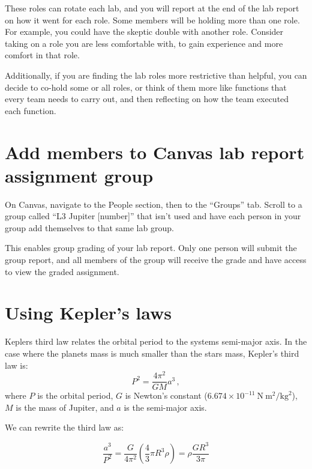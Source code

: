 These roles can rotate each lab, and you will report at the end of the lab report on how it went for each role. Some members will be holding more than one role. For example, you could have the skeptic double with another role. Consider taking on a role you are less comfortable with, to gain experience and more comfort in that role.

Additionally, if you are finding the lab roles more restrictive than helpful, you can decide to co-hold some or all roles, or think of them more like functions that every team needs to carry out, and then reflecting on how the team executed each function.

\section{Add members to Canvas lab report assignment group}

\begin{steps}
	\item On Canvas, navigate to the People section, then to the ``Groups'' tab. Scroll to a group called ``L3 Jupiter [number]'' that isn't used and have each person in your group add themselves to that same lab group.
\end{steps}

This enables group grading of your lab report. Only one person will submit the group report, and all members of the group will receive the grade and have access to view the graded assignment.

\section{Using Kepler's laws}

Keplers third law relates the orbital period to the systems semi-major axis. In the case where the planets mass is much smaller than the stars mass, Kepler's third law is:
\begin{equation}
P^2 = \frac{4\pi^2}{G M}a^3 \,,
\end{equation}
where $P$ is the orbital period, $G$ is Newton's constant ($6.674 \times 10^{-11}\:\textrm{N}\:\textrm{m}^2/\textrm{kg}^2$), $M$ is the mass of Jupiter, and $a$ is the semi-major axis.

We can rewrite the third law as:

\begin{equation}
\frac{a^3}{P^2} = \frac{G}{4\pi^2}\left(\frac{4}{3}\pi R^3\rho \right) = \rho\frac{G R^3}{3\pi}
\end{equation}

